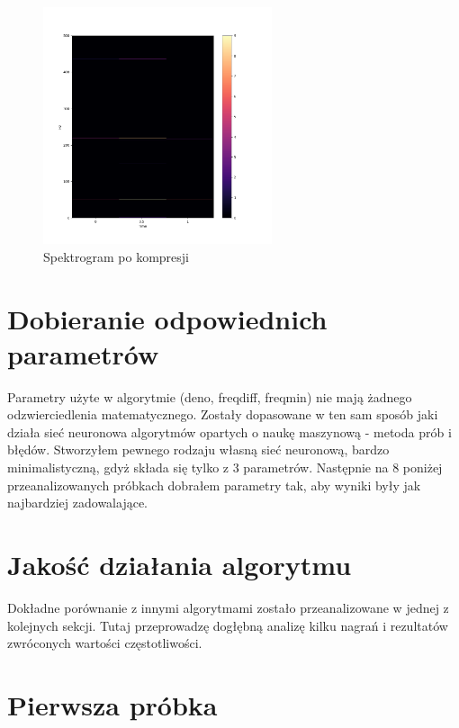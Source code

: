 \documentclass[a4paper,12pt]{extarticle}
\begin{document}
\begin{figure}[h!]
\centering
\includegraphics[width=0.6\textwidth]{po-kompresji}
\caption{Spektrogram po kompresji}
\end{figure}

\clearpage

\section*{Dobieranie odpowiednich parametrów}

Parametry użyte w algorytmie (deno, freqdiff, freqmin) nie mają żadnego odzwierciedlenia matematycznego. Zostały dopasowane w ten sam sposób jaki działa sieć neuronowa algorytmów opartych o naukę maszynową - metoda prób i błędów. Stworzyłem pewnego rodzaju własną sieć neuronową, bardzo minimalistyczną, gdyż składa się tylko z 3 parametrów. Następnie na 8 poniżej przeanalizowanych próbkach dobrałem parametry tak, aby wyniki były jak najbardziej zadowalające.

\section*{Jakość działania algorytmu}

Dokładne porównanie z innymi algorytmami zostało przeanalizowane w jednej z kolejnych sekcji. Tutaj przeprowadzę dogłębną analizę kilku nagrań i rezultatów zwróconych wartości częstotliwości.

\clearpage

\section*{Pierwsza próbka}
\end{document}
